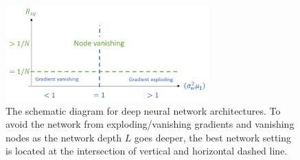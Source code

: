 \begin{figure}
\centering
\includegraphics[width=0.7\textwidth]{theo}
\caption{The schematic diagram for deep neural network architectures. To avoid the network from exploding/vanishing gradients and vanishing nodes as the network depth $L$ goes deeper, the best network setting is located at the intersection of vertical and horizontal dashed line.}
\label{fig:sec6_theo1}
\setlength{\belowcaptionskip}{-10pt}
\end{figure}